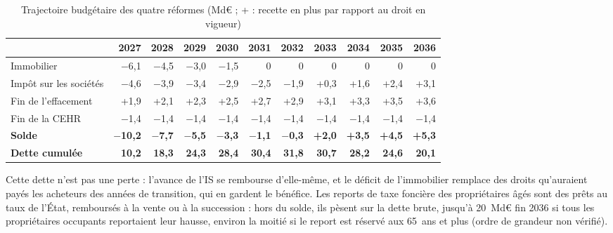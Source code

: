 \begin{table}[!htbp]\centering\scriptsize\setlength{\tabcolsep}{3.2pt}
\caption{Trajectoire budgétaire des quatre réformes (Md€ ; + : recette en plus par rapport au droit en vigueur)}\label{tab:ens_traj}
\begin{tabularx}{\linewidth}{@{}>{\raggedright\arraybackslash}X rrrrrrrrrr@{}}
\toprule
 & 2027 & 2028 & 2029 & 2030 & 2031 & 2032 & 2033 & 2034 & 2035 & 2036 \\
\midrule
Immobilier & $-$6,1 & $-$4,5 & $-$3,0 & $-$1,5 & 0 & 0 & 0 & 0 & 0 & 0 \\
Impôt sur les sociétés & $-$4,6 & $-$3,9 & $-$3,4 & $-$2,9 & $-$2,5 & $-$1,9 & +0,3 & +1,6 & +2,4 & +3,1 \\
Fin de l'effacement & +1,9 & +2,1 & +2,3 & +2,5 & +2,7 & +2,9 & +3,1 & +3,3 & +3,5 & +3,6 \\
Fin de la CEHR & $-$1,4 & $-$1,4 & $-$1,4 & $-$1,4 & $-$1,4 & $-$1,4 & $-$1,4 & $-$1,4 & $-$1,4 & $-$1,4 \\
\textbf{Solde} & \textbf{$-$10,2} & \textbf{$-$7,7} & \textbf{$-$5,5} & \textbf{$-$3,3} & \textbf{$-$1,1} & \textbf{$-$0,3} &
\textbf{+2,0} & \textbf{+3,5} & \textbf{+4,5} & \textbf{+5,3} \\
\textbf{Dette cumulée} & \textbf{10,2} & \textbf{18,3} & \textbf{24,3} & \textbf{28,4} & \textbf{30,4} & \textbf{31,8} &
\textbf{30,7} & \textbf{28,2} & \textbf{24,6} & \textbf{20,1} \\
\bottomrule
\end{tabularx}
\par{}
\end{table}


Cette dette n'est pas une perte : l'avance de l'IS se rembourse d'elle-même, et le déficit de l'immobilier remplace
des droits qu'auraient payés les acheteurs des années de transition, qui en gardent le bénéfice. Les reports de taxe
foncière des propriétaires âgés sont des prêts au taux de l'État, remboursés à la vente ou à la succession : hors du
solde, ils pèsent sur la dette brute, jusqu'à 20~Md€ fin 2036 si tous les propriétaires occupants reportaient leur
hausse, environ la moitié si le report est réservé aux 65~ans et plus (ordre de grandeur non vérifié).

